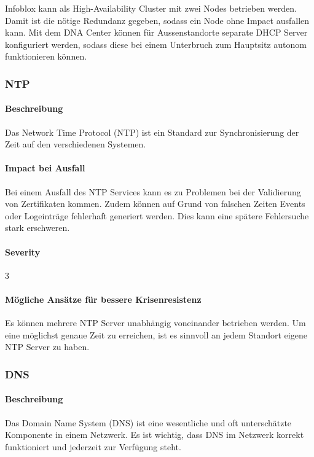 Infoblox kann als High-Availability Cluster mit zwei Nodes betrieben werden. Damit ist die nötige Redundanz gegeben, sodass ein Node ohne Impact ausfallen kann. Mit dem DNA Center können für Aussenstandorte separate DHCP Server konfiguriert werden, sodass diese bei einem Unterbruch zum Hauptsitz autonom funktionieren können.


\subsubsection{NTP}
\paragraph{Beschreibung}
Das Network Time Protocol (NTP) ist ein Standard zur Synchronisierung der Zeit auf den verschiedenen Systemen.

\paragraph{Impact bei Ausfall}
Bei einem Ausfall des NTP Services kann es zu Problemen bei der Validierung von Zertifikaten kommen. Zudem können auf Grund von falschen Zeiten Events oder Logeinträge fehlerhaft generiert werden. Dies kann eine spätere Fehlersuche stark erschweren.

\paragraph{Severity} 3

\paragraph{Mögliche Ansätze für bessere Krisenresistenz}
Es können mehrere NTP Server unabhängig voneinander betrieben werden. Um eine möglichst genaue Zeit zu erreichen, ist es sinnvoll an jedem Standort eigene NTP Server zu haben.

\subsubsection{DNS}
\paragraph{Beschreibung}
Das Domain Name System (DNS) ist eine wesentliche und oft unterschätzte Komponente in einem Netzwerk. Es ist wichtig, dass DNS im Netzwerk korrekt funktioniert und jederzeit zur Verfügung steht.

